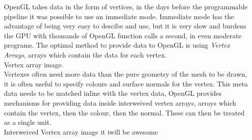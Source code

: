 

OpenGL takes data in the form of vertices, in the days before the programmable 
pipeline it was possible to use an immediate mode. Immediate mode has the 
advantage of being very easy to descibe and use, but it is very slow and burdens
the GPU with thousands of OpenGL function calls a second, in even moderate 
programs. The optimal method to provide data to OpenGL is using \emph{Vertex
Arrays}, arrays which contain the data for each vertex.\\

Vertex array image.\\

Vertexes often need more data than the pure geometry of the mesh to be drawn, it
is often useful to specify colours and surface normals for the vertex. This meta
data needs to be matched inline with the vertex data, OpenGL provides mechanisms
for providing data inside interweived vertex arrays, arrays which contain the 
vertex, then the colour, then the normal. These can then be treated as a single
unit.\\



Interweived Vertex array image it iwill be awesome\\
